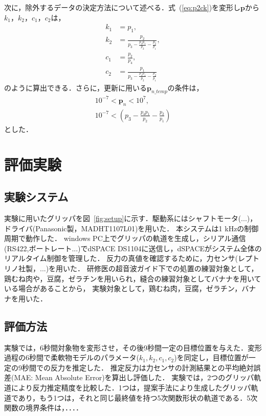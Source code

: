 \documentclass[a4paper]{jarticle}
\begin{document}
次に，除外するデータの決定方法について述べる．式~(\ref{eq:p2ck})を変形し$\mathbf{p}$から$k_1$，$k_2$，$c_1$，$c_2$は，
\begin{equation}
    \begin{aligned}
        k_1 &= p_1 ,\\
        k_2 &= \frac{p_2}{p_3 - \frac{p_4 p_1}{p_2} - \frac{p_2}{p_1}} ,\\
        c_1 &= \frac{p_2}{p_4},\\
        c_2 &= \frac{p_1}{p_3 - \frac{p_4 p_1}{p_2} - \frac{p_2}{p_1}} 
    \end{aligned}
\end{equation}
のように算出できる．さらに，更新に用いる$\mathbf{p}_{n\_temp}$の条件は，
\begin{equation}
    \begin{aligned}
        10^{-7} < \mathbf{p}_{n} < 10^{7} ,\\
        10^{-7} < \left( p_3 - \frac{p_4 p_1}{p_2} - \frac{p_2}{p_1} \right)
    \end{aligned}
\end{equation}
とした．

\section{評価実験}
\subsection{実験システム}
実験に用いたグリッパを図~\ref{fig:setup}に示す．駆動系にはシャフトモータ(...)，ドライバ(Panasonic製，MADHT1107L01)を用いた．
本システムは1 kHzの制御周期で動作した．
windows PC上でグリッパの軌道を生成し，シリアル通信(RS422,ボートレート...)でdSPACE DS1104に送信し，dSPACEがシステム全体のリアルタイム制御を管理した．
反力の真値を確認するために，力センサ(レプトリノ社製，...)を用いた．
研修医の超音波ガイド下での処置の練習対象として，鶏むね肉や，豆腐，ゼラチンを用いられ，縫合の練習対象としてバナナを用いている場合があることから\cite{?}\cite{?}\cite{?}，
実験対象として，鶏むね肉，豆腐，ゼラチン，バナナを用いた．
\subsection{評価方法}
実験では，6秒間対象物を変形させ，その後9秒間一定の目標位置を与えた．変形過程の6秒間で柔軟物モデルのパラメータ($k_1, k_2, c_1, c_2$)を同定し，目標位置が一定の9秒間での反力を推定した．
推定反力は力センサの計測結果との平均絶対誤差(MAE: Mean Absolute Error)を算出し評価した．
実験では，2つのグリッパ軌道により反力推定精度を比較した．1つは，提案手法により生成したグリッパ軌道であり，もう1つは，それと同じ最終値を持つ5次関数形状の軌道である．5次関数の境界条件は，．．．．
\end{document}
